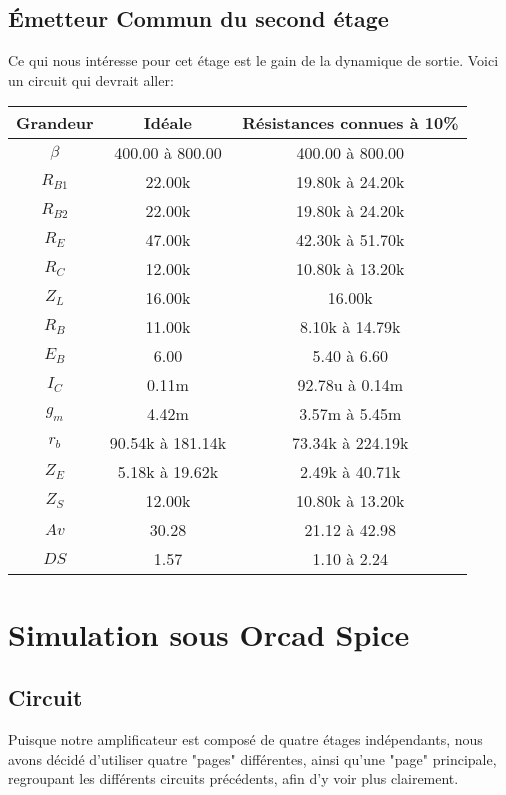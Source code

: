 \documentclass[11pt;a4paper]{report}
\begin{document}
  \section{Émetteur Commun du second étage}

  Ce qui nous intéresse pour cet étage est le gain de la dynamique de sortie.
  Voici un circuit qui devrait aller:
   \begin{tabular}{|c|c|c|}
    \hline
 Grandeur  & Idéale    &  Résistances connues à 10\% \\\hline
 $\beta$   &         400.00 à 800.00 &  400.00 à 800.00 \\\hline
 $R_{B1}$  &          22.00k     &   19.80k à 24.20k \\\hline
 $R_{B2}$  &          22.00k     &   19.80k à 24.20k \\\hline
 $R_E$  &          47.00k     &   42.30k à 51.70k \\\hline
 $R_C$  &          12.00k     &   10.80k à 13.20k \\\hline
 $Z_L$  &          16.00k     &        16.00k      \\\hline
 $R_B$  &          11.00k     &   8.10k à 14.79k  \\\hline
 $E_B$  &           6.00      &     5.40 à 6.60   \\\hline
 $I_C$  &          0.11m      &   92.78u à 0.14m  \\\hline
 $g_m$  &          4.42m      &    3.57m à 5.45m  \\\hline
 $r_b$  &    90.54k à 181.14k & 73.34k à 224.19k \\\hline
 $Z_E$  &     5.18k à 19.62k  &  2.49k à 40.71k  \\\hline
 $Z_S$  &          12.00k     &   10.80k à 13.20k \\\hline
 $Av$   &          30.28      &    21.12 à 42.98  \\\hline
 $DS$   &           1.57      &     1.10 à 2.24   \\\hline
\end{tabular}

 \chapter{Simulation sous Orcad Spice}
  \section{Circuit}
    Puisque notre amplificateur est composé de quatre étages indépendants, nous avons décidé d'utiliser quatre "pages"
    différentes, ainsi qu'une "page"  principale, regroupant les différents circuits précédents, afin d'y voir plus clairement.
\end{document}

